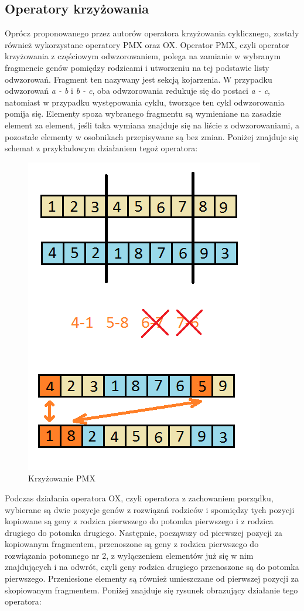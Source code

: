 \subsection{Operatory krzyżowania}
Oprócz proponowanego przez autorów operatora krzyżowania cyklicznego, zostały również wykorzystane operatory PMX oraz OX.
Operator PMX, czyli operator krzyżowania z częściowym odwzorowaniem, polega na zamianie w wybranym fragmencie genów pomiędzy rodzicami i utworzeniu na tej podstawie listy odwzorowań. Fragment ten nazywany jest sekcją kojarzenia. W przypadku odwzorowań \textit{a - b} i \textit{b - c}, oba odwzorowania redukuje się do postaci \textit{a - c}, natomiast w przypadku występowania cyklu, tworzące ten cykl odwzorowania pomija się. Elementy spoza wybranego fragmentu są wymieniane na zasadzie element za element, jeśli taka wymiana znajduje się na liście z odwzorowaniami, a pozostałe elementy w osobnikach przepisywane są bez zmian. Poniżej znajduje się schemat z przykładowym działaniem tegoż operatora:
\begin{figure}[h]
\includegraphics[scale=1]{pmx}
\caption{Krzyżowanie PMX}
\end{figure}

Podczas działania operatora OX, czyli operatora z zachowaniem porządku, wybierane są dwie pozycje genów z rozwiązań rodziców i spomiędzy tych pozycji kopiowane są geny z rodzica pierwszego do potomka pierwszego i z rodzica drugiego do potomka drugiego. Następnie, począwszy od pierwszej pozycji za kopiowanym fragmentem, przenoszone są geny z rodzica pierwszego do rozwiązania potomnego nr 2, z wyłączeniem elementów już się w nim znajdujących i na odwrót, czyli geny rodzica drugiego przenoszone są do potomka pierwszego. Przeniesione elementy są również umieszczane od pierwszej pozycji za skopiowanym fragmentem. Poniżej znajduje się rysunek obrazujący działanie tego operatora:

